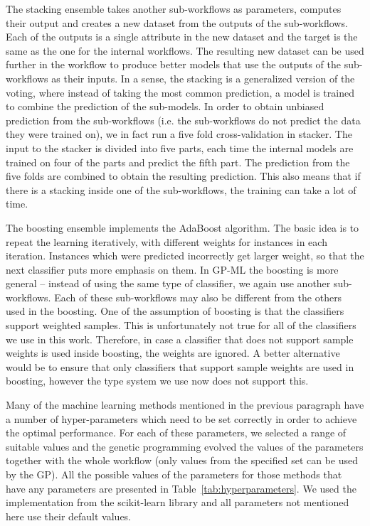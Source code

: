 \documentclass{ws-ijait}
\begin{document}
The stacking ensemble takes another sub-workflows as parameters, computes their
output and creates a new dataset from the outputs of the sub-workflows. Each of
the outputs is a single attribute in the new dataset and the target is the same
as the one for the internal workflows. The resulting new dataset can be used
further in the workflow to produce better models that use the outputs of the
sub-workflows as their inputs. In a sense, the stacking is a generalized version
of the voting, where instead of taking the most common prediction, a model is
trained to combine the prediction of the sub-models. In order to obtain unbiased
prediction from the sub-workflows (i.e. the sub-workflows do not predict the
data they were trained on), we in fact run a five fold cross-validation in
stacker. The input to the stacker is divided into five parts, each time the 
internal models are trained on four of the parts and predict the fifth part. The
prediction from the five folds are combined to obtain the resulting prediction.
This also means that if there is a stacking inside one of the sub-workflows, the
training can take a lot of time.

The boosting ensemble implements the AdaBoost algorithm\cite{FREUND1997119}. The
basic idea is to repeat the learning iteratively, with different weights for
instances in each iteration. Instances which were predicted incorrectly get
larger weight, so that the next classifier puts more emphasis on them. In GP-ML
the boosting is more general -- instead of using the same type of classifier, we
again use another sub-workflows. Each of these sub-workflows may also be
different from the others used in the boosting. One of the assumption of
boosting is that the classifiers support weighted samples. This is unfortunately
not true for all of the classifiers we use in this work. Therefore, in case a
classifier that does not support sample weights is used inside boosting, the
weights are ignored. A better alternative would be to ensure that only
classifiers that support sample weights are used in boosting, however the type
system we use now does not support this.

Many of the machine learning methods mentioned in the previous paragraph have a
number of hyper-parameters which need to be set correctly in order to achieve
the optimal performance. For each of these parameters, we selected a range of
suitable values and the genetic programming evolved the values of the parameters
together with the whole workflow (only values from the specified set can be used
by the GP). All the possible values of the parameters for those methods that
have any parameters are presented in Table~\ref{tab:hyperparameters}. We used
the implementation from the scikit-learn library and all parameters not
mentioned here use their default values.
\end{document}
